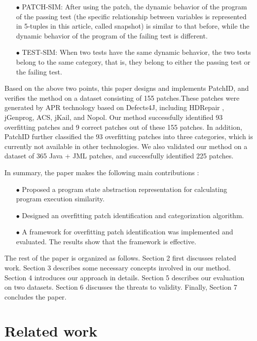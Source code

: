 \begin{itemize}
	\item[$\bullet$] PATCH-SIM: After using the patch, the dynamic behavior of the program of the passing test (the specific relationship between variables is represented in 5-tuples in this article, called snapshot) is similar to that before, while the dynamic behavior of the program of the failing test is different.
	\item[$\bullet$] TEST-SIM: When two tests have the same dynamic behavior, the two tests belong to the same category, that is, they belong to either the passing test or the failing test.
\end{itemize}

Based on the above two points, this paper designs and implements PatchID, and verifies the method on a dataset consisting of 155 patches.These patches were generated by APR technology based on Defects4J, including HDRepair\cite{ref17} , jGenprog\cite{ref8}, ACS\cite{ref9}, jKail\cite{ref10}, and Nopol\cite{ref11}. Our method successfully identified 93 overfitting patches and 9 correct patches out of these 155 patches. In addition, PatchID further classified the 93 overfitting patches into three categories, which is currently not available in other technologies. We also validated our method on a dataset of 365 Java + JML patches\cite{ref54}, and successfully identified 225 patches.

In summary, the paper makes the following main contributions :

\begin{itemize}
	\item[$\bullet$] Proposed a program state abstraction representation for calculating program execution similarity.
	\item[$\bullet$] Designed an overfitting patch identification and categorization algorithm.
	\item[$\bullet$] A framework for overfitting patch identification was implemented and evaluated. The results show that the framework is effective.
\end{itemize}

The rest of the paper is organized as follows. Section 2 first discusses related work. Section 3 describes some necessary concepts involved in our method. Section 4 introduces our approach in details. Section 5 describes our evaluation on two datasets. Section 6 discusses the threats to validity. Finally, Section 7 concludes the paper.

\section{Related work}
\label{2}

